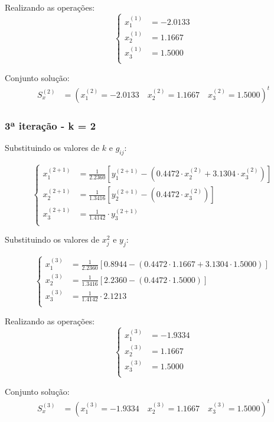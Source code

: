 \documentclass[12pt,a4paper]{article}
\begin{document}
Realizando as operações:
\[
\left\{
\begin{aligned}
x_1^{(1)} &= - 2.0133 \\
x_2^{(1)} &= 1.1667 \\
x_3^{(1)} &= 1.5000 \\
\end{aligned}
\right.
\]

Conjunto solução:
\begin{align*}
S_x^{(2)} &= ( x_1^{(2)} = -2.0133 \quad x_2^{(2)} = 1.1667 \quad x_3^{(2)} = 1.5000 )^{t}
\end{align*}

\subsubsection{3ª iteração - k = 2}

Substituindo os valores de $k$ e $g_{ij}$:

\[
\left\{
\begin{aligned}
x_1^{(2+1)} &= \frac{1}{2.2360} \left[ y_1^{(2+1)} - \left(0.4472 \cdot x_2^{(2)} + 3.1304 \cdot x_3^{(2)}\right) \right] \\
x_2^{(2+1)} &= \frac{1}{1.3416} \left[ y_2^{(2+1)} - \left(0.4472 \cdot x_3^{(2)}\right) \right] \\
x_3^{(2+1)} &= \frac{1}{1.4142} \cdot y_3^{(2+1)} \\
\end{aligned}
\right.
\]

Substituindo os valores de $x_j^{2}$ e $y_j$:

\[
\left\{
\begin{aligned}
x_1^{(3)} &= \frac{1}{2.2360} \left[ 0.8944 - \left(0.4472 \cdot 1.1667 + 3.1304 \cdot 1.5000\right) \right] \\
x_2^{(3)} &= \frac{1}{1.3416} \left[ 2.2360 - \left(0.4472 \cdot 1.5000\right) \right] \\
x_3^{(3)} &= \frac{1}{1.4142} \cdot 2.1213 \\
\end{aligned}
\right.
\]

Realizando as operações:
\[
\left\{
\begin{aligned}
x_1^{(3)} &= - 1.9334 \\
x_2^{(3)} &= 1.1667 \\
x_3^{(3)} &= 1.5000 \\
\end{aligned}
\right.
\]

Conjunto solução:
\begin{align*}
S_x^{(3)} &= ( x_1^{(3)} = - 1.9334 \quad x_2^{(3)} = 1.1667 \quad x_3^{(3)} = 1.5000 )^{t}
\end{align*}
\end{document}
